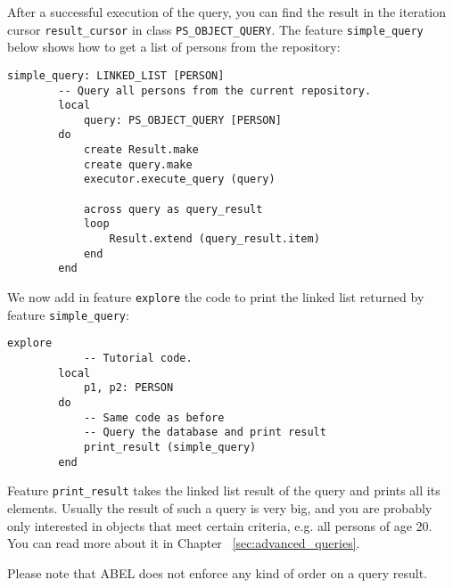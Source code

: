 \documentclass[a4paper,12pt]{report}
\begin{document}
After a successful execution of the query, you can find the result in the iteration cursor \lstinline{result_cursor} in class \lstinline{PS_OBJECT_QUERY}. The feature \lstinline{simple_query} below shows how to get a list of persons from the repository:

\begin{lstlisting}[language=OOSC2Eiffel, captionpos=b, caption={A simple query.}, label={lst:simple_query}]
	simple_query: LINKED_LIST [PERSON]
		-- Query all persons from the current repository.
		local
			query: PS_OBJECT_QUERY [PERSON]
		do
			create Result.make
			create query.make
			executor.execute_query (query)

			across query as	query_result
			loop
				Result.extend (query_result.item)
			end
		end
\end{lstlisting}
We now add in feature \lstinline{explore} the code to print the linked list returned by feature \lstinline{simple_query}:  
\begin{lstlisting}[language=OOSC2Eiffel, captionpos=b, caption={Printing the query result.}, label={lst:tutorial_print_result}]
	explore
			-- Tutorial code.
		local
			p1, p2: PERSON
		do
			-- Same code as before
			-- Query the database and print result
			print_result (simple_query)
		end
\end{lstlisting}
Feature  \lstinline{print_result} takes the linked list result of the query and prints all its elements.
Usually the result of such a query is very big, and you are probably only interested in objects that meet certain criteria, e.g. all persons of age 20. You can read more about it in Chapter ~\ref{sec:advanced_queries}.

Please note that ABEL does not enforce any kind of order on a query result.

%
%
%
%
\end{document}
